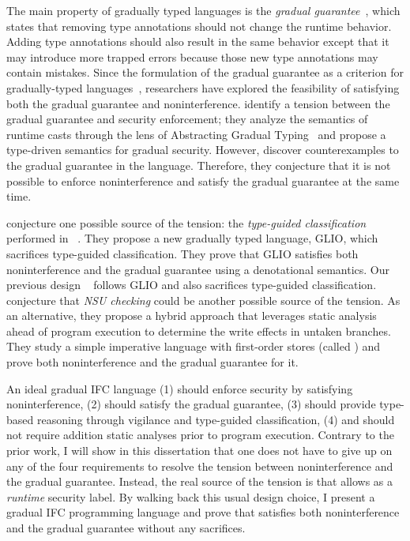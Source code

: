 The main property of gradually typed languages is the \textit{gradual
  guarantee}~\cite{Siek:2015ac}, which states that removing type annotations
should not change the runtime behavior. Adding type annotations should also
result in the same behavior except that it may introduce more trapped errors
because those new type annotations may contain mistakes. Since the formulation
of the gradual guarantee as a criterion for gradually-typed
languages~\cite{Siek:2015ac}, researchers have explored the feasibility of
satisfying both the gradual guarantee and noninterference.
\textcite{Toro:2018aa} identify a tension between the gradual guarantee and
security enforcement; they analyze the semantics of runtime casts through the
lens of Abstracting Gradual Typing~\parencite{Garcia:2016aa} and propose a
type-driven semantics for gradual security. However, \textcite{Toro:2018aa}
discover counterexamples to the gradual guarantee in the \GSLRef language.
Therefore, they conjecture that it is not possible to enforce noninterference
and satisfy the gradual guarantee at the same time.

\textcite{Amorim:2020aa} conjecture one possible source of the tension: the
\textit{type-guided classification} performed in
\GSLRef~\parencite{Toro:2018aa}. They propose a new gradually typed language,
GLIO, which sacrifices type-guided classification. They prove that GLIO
satisfies both noninterference and the gradual guarantee using a denotational
semantics. Our previous design \SurfaceOld~\parencite{Chen:2022aa} follows GLIO
and also sacrifices type-guided classification.
%
\textcite{bichhawat2021gradual} conjecture that \textit{NSU checking} could be
another possible source of the tension. As an alternative, they propose a hybrid
approach that leverages static analysis ahead of program execution to determine
the write effects in untaken branches. They study a simple imperative language
with first-order stores (called \WHILEG) and prove both noninterference and the
gradual guarantee for it.

An ideal gradual IFC language (1) should enforce security by satisfying
noninterference, (2) should satisfy the gradual guarantee, (3) should provide
type-based reasoning through vigilance and type-guided classification, (4) and
should not require addition static analyses prior to program execution. Contrary
to the prior work, I will show in this dissertation that one does not have to
give up on any of the four requirements to resolve the tension between
noninterference and the gradual guarantee. Instead, the real source of the
tension is that \GSLRef allows \unk as a \emph{runtime} security label. By
walking back this usual design choice, I present a gradual IFC programming
language \Surface and prove that \Surface satisfies both noninterference and the
gradual guarantee without any sacrifices.

